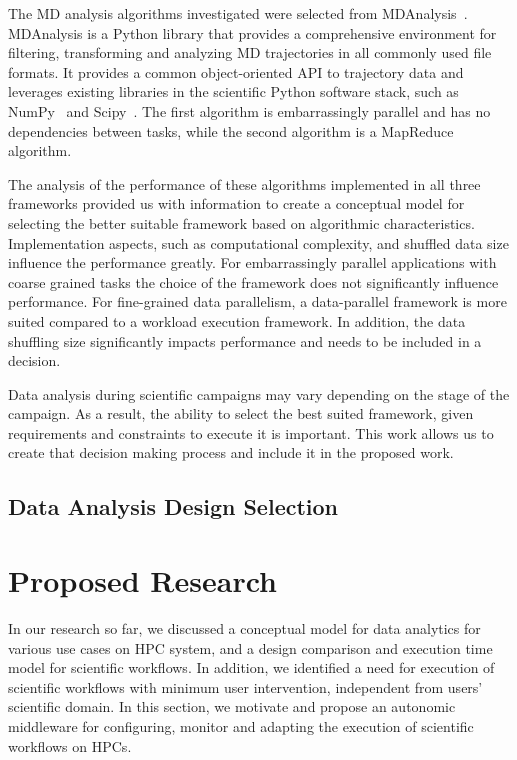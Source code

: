 The MD analysis algorithms investigated were selected from MDAnalysis~\cite{gowers2016mdanalysis,michaud2011mdanalysis}. MDAnalysis is a Python library that provides a comprehensive environment for filtering, transforming and analyzing MD trajectories in all commonly used file formats. It provides a common object-oriented API to trajectory data and leverages existing libraries in the scientific Python software stack, such as NumPy~\cite{numpy} and Scipy~\cite{scipy}. The first algorithm is embarrassingly parallel and has no dependencies between tasks, while the second algorithm is a MapReduce algorithm.

The analysis of the performance of these algorithms implemented in all three frameworks provided us with information to create a conceptual model for selecting the better suitable framework based on algorithmic characteristics. Implementation aspects, such as computational complexity, and shuffled data size influence the performance greatly. For embarrassingly parallel applications with coarse grained tasks the choice of the framework does not significantly influence performance. For fine-grained data parallelism, a data-parallel framework is more suited compared to a workload execution framework. In addition, the data shuffling size significantly impacts performance and needs to be included in a decision.

Data analysis during scientific campaigns may vary depending on the stage of the campaign. As a result, the ability to select the best suited framework, given requirements and constraints to execute it is important. This work allows us to create that decision making process and include it in the proposed work.

\subsection{Data Analysis Design Selection}


\section{Proposed Research}

In our research so far, we discussed a conceptual model for data analytics for various use cases on HPC system, and a design comparison and execution time model for scientific workflows. In addition, we identified a need for execution of scientific workflows with minimum user intervention, independent from users' scientific domain. In this section, we motivate and propose an autonomic middleware for configuring, monitor and adapting the execution of scientific workflows on HPCs.

